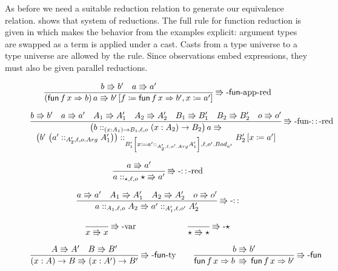 As before we need a suitable reduction relation to generate our equivalence relation.
 shows that system of reductions.
The full rule for function reduction is given in  which makes the behavior from the examples explicit: argument types are swapped as a term is applied under a cast.
Casts from a type universe to a type universe are allowed by the  rule.
Since observations embed expressions, they must also be given parallel reductions.
 
\begin{figure}
\[
\frac{b\Rrightarrow b'\quad a\Rrightarrow a'}{\left(\mathsf{fun}\,f\,x\Rightarrow b\right)a\Rrightarrow b'\left[f\coloneqq\mathsf{fun}\,f\,x\Rightarrow b',x\coloneqq a'\right]}
\operatorname{\Rrightarrow-\mathsf{fun}-app-red}
\]
 
\[
\frac{b\Rrightarrow b'\quad a\Rrightarrow a'\quad A_{1}\Rrightarrow A_{1}'\quad A_{2}\Rrightarrow A_{2}'\quad B_{1}\Rrightarrow B_{1}'\quad B_{2}\Rrightarrow B_{2}'\quad o\Rrightarrow o'}{\begin{array}{c}
\left(b::_{\left(x:A_{1}\right)\rightarrow B_{1},\ell ,o}\left(x:A_{2}\right)\rightarrow B_{2}\right)a\Rrightarrow\\
\left(b'\,\left(a'::_{A_{2}',\ell,o.Arg}A_{1}'\right)\right)::_{B_{1}'\left[x\coloneqq a'::_{A_{2}',\ell,o'.Arg}A_{1}'\right],\ell ,o'.Bod_{a'} }B_{2}'\left[x\coloneqq a'\right]
\end{array}}
\operatorname{\Rrightarrow-fun-::-red}
\]
 
\[
\frac{a\Rrightarrow a'}{a::_{\star,\ell,o}\star\Rrightarrow a'}
\operatorname{\Rrightarrow-::-red}
\]

\[
\frac{a\Rrightarrow a'\quad A_{1}\Rrightarrow A_{1}'\quad A_{2}\Rrightarrow A_{2}'\quad o\Rrightarrow o'}{a::_{A_{1},\ell ,o}A_{2}\Rrightarrow a'::_{A_{1}',\ell ,o'}A_{2}'}
\operatorname{\Rrightarrow-::}
\]

\begin{align*}
\frac{\,}{x\Rrightarrow x}
\operatorname{\Rrightarrow-var} \quad \quad \quad & \quad \quad \quad \frac{\,}{\star\Rrightarrow\star}
\operatorname{\Rrightarrow-\star}\\
\end{align*}

\begin{align*}
\frac{A\Rrightarrow A'\quad B\Rrightarrow B'}{\left(x:A\right)\rightarrow B\Rrightarrow\left(x:A'\right)\rightarrow B'}
\operatorname{\Rrightarrow-\mathsf{fun}-ty} \quad & \quad \frac{b\Rrightarrow b'}{\mathsf{fun}\,f\,x\Rightarrow b\,\Rrightarrow\,\mathsf{fun}\,f\,x\Rightarrow b'}
\operatorname{\Rrightarrow-\mathsf{fun}}\\
\end{align*}


\end{figure}
